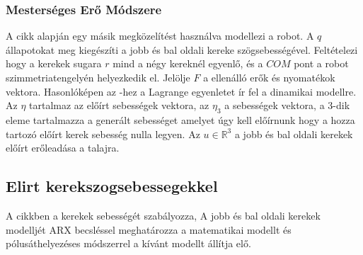 



\subsubsection{Mesterséges Erő Módszere}
A \cite{SSMRartificialForceMethod} cikk alapján egy másik megközelítést használva modellezi a robot. A $q$ állapotokat meg kiegészíti a jobb és bal oldali kereke szögsebességével. Feltételezi hogy a kerekek sugara $r$ mind a négy kereknél egyenlő, és a $COM$ pont a robot szimmetriatengelyén helyezkedik el. Jelölje $F$ a ellenálló erők és nyomatékok vektora. Hasonlóképen az   -hez a Lagrange egyenletet ír fel a dinamikai modellre. Az $\eta$ tartalmaz az előírt sebességek vektora, az $\eta_{3}$ a sebességek vektora, a 3-dik eleme tartalmazza a generált sebességet amelyet úgy kell előírnunk hogy a hozza tartozó előírt kerek sebesség nulla legyen.
Az $u \in \mathbb{R}^3$ a jobb és bal oldali kerekek előírt erőleadása a talajra.







\subsection{Elirt kerekszogsebessegekkel}
A \cite{Campa2014} cikkben a kerekek sebességét szabályozza, A jobb és bal oldali kerekek modelljét ARX becsléssel meghatározza a matematikai modellt és pólusáthelyezéses  módszerrel a kívánt modellt állítja elő. 

\renewcommand{\img}{SajatRobot/SzerkAbrak/SebContRefOmega.tex}
\renewcommand{\sources}{*}
\renewcommand{\captionn}{Kinematikai modell az $SSMR$ típusú $MR$ robotnak.}
\renewcommand{\figlabel}{DinamicSpeedController}




